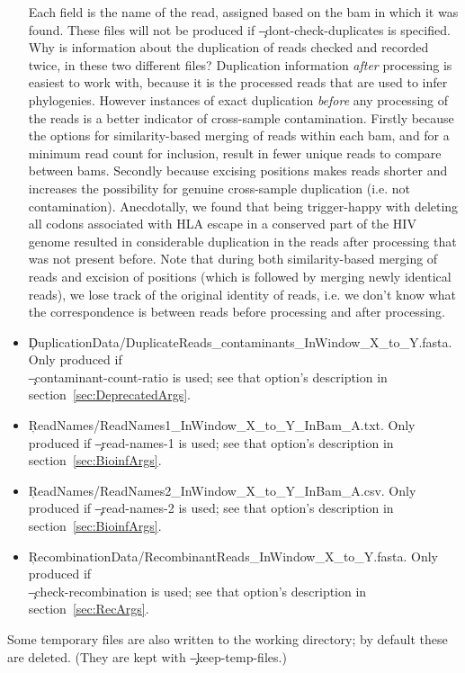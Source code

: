 \begin{itemize}
Each field is the name of the read, assigned based on the bam in which it was found.
These files will not be produced if \c{--dont-check-duplicates} is specified.\\
Why is information about the duplication of reads checked and recorded twice, in these two different files?
Duplication information {\it after} processing is easiest to work with, because it is the processed reads that are used to infer phylogenies.
However instances of exact duplication {\it before} any processing of the reads is a better indicator of cross-sample contamination.
Firstly because the options for similarity-based merging of reads within each bam, and for a minimum read count for inclusion, result in fewer unique reads to compare between bams.
Secondly because excising positions makes reads shorter and increases the possibility for genuine cross-sample duplication (i.e. not contamination).
Anecdotally, we found that being trigger-happy with deleting all codons associated with HLA escape in a conserved part of the HIV genome resulted in considerable duplication in the reads after processing that was not present before.
Note that during both similarity-based merging of reads and excision of positions (which is followed by merging newly identical reads), we lose track of the original identity of reads, i.e. we don't know what the correspondence is between reads before processing and after processing.
\item \c{DuplicationData/DuplicateReads\_contaminants\_InWindow\_X\_to\_Y.fasta}.
Only produced if \\\c{--contaminant-count-ratio} is used; see that option's description in section~\ref {sec:DeprecatedArgs}.
\item \c{ReadNames/ReadNames1\_InWindow\_X\_to\_Y\_InBam\_A.txt}.
Only produced if \c{--read-names-1} is used; see that option's description in section~\ref{sec:BioinfArgs}.
\item \c{ReadNames/ReadNames2\_InWindow\_X\_to\_Y\_InBam\_A.csv}.
Only produced if \c{--read-names-2} is used; see that option's description in section~\ref{sec:BioinfArgs}.
\item \c{RecombinationData/RecombinantReads\_InWindow\_X\_to\_Y.fasta}.
Only produced if \\\c{--check-recombination} is used; see that option's description in section~\ref{sec:RecArgs}.
\end{itemize}
Some temporary files are also written to the working directory; by default these are deleted.
(They are kept with \c{--keep-temp-files}.)

